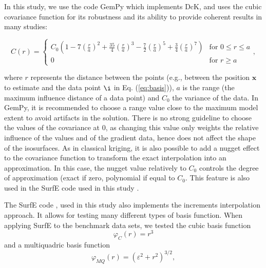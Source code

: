 \documentclass[preprint]{ring20}
\newcommand{\bx}{\mathbf{x}}
\begin{document}
In this study, we use the code GemPy \cite{delaVarga2018GMDD} which implements DcK, and uses the cubic covariance function for its  robustness and its ability to provide coherent results in many studies: 

\begin{equation}
C(r) = \begin{cases}
C_0(1-7(\frac{r}{a})^2+ \frac{35}{4}(\frac{r}{a})^3
- \frac{7}{2}(\frac{r}{a})^5 +\frac{3}{4}(\frac{r}{a})^7) &
\text{for } 0  \leq r \leq a \\
0 & \text{for } r  \geq a
\end{cases},
\end{equation}

\noindent where $r$ represents the distance between the points (e.g., between the position $\bx$ to estimate and the data point $\i$ in Eq. (\ref{eq:basis})), $a$ is the range (the maximum influence distance of a data point) 
and $C_0$ the variance of the data. In GemPy, it is recommended to choose a range value close to the
maximum model extent to avoid artifacts in the solution. There is no strong guideline 
to choose the values of the covariance at 0, as changing this value only weights the relative influence of the values and of the gradient data, hence does not affect the shape of the isosurfaces. 
As in classical kriging, it is also possible to add a nugget effect to the covariance function to transform the exact interpolation into an approximation. In this case, the nugget value relatively to $C_0$ controls the degree of approximation (exact if zero, polynomial if equal to $C_0$. This feature is also used in the SurfE code used in this study \citep{Hillier2014MG}. %

The SurfE code \citep{Hillier2014MG}, used in this study also implements the increments interpolation approach. It allows for testing many different types of basis function. When applying SurfE to the benchmark data sets, we tested the cubic basis function 
\begin{equation}
\varphi_{C}(r) = r^3
\end{equation}
and a multiquadric basis function
\begin{equation}
\varphi_{MQ}(r) = (\varepsilon^2 + r^2)^{3/2},
\end{equation}
\end{document}
